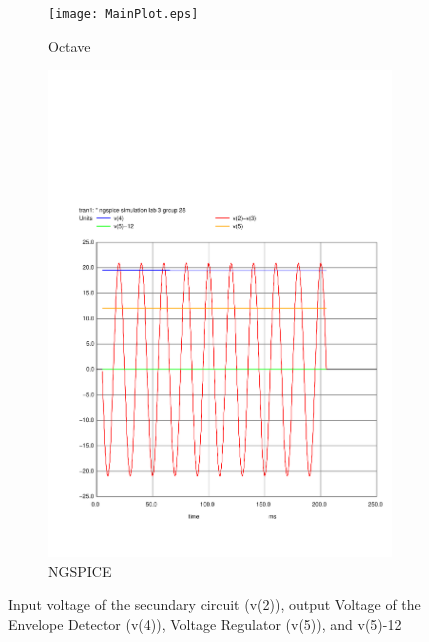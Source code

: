 \begin{figure}[H] 
\centering
\begin{subfigure}{0.4\textwidth}
\texttt{[image: MainPlot.eps]}
\caption{Octave}
\label{fig:first}
\end{subfigure}
\begin{subfigure}{0.3\textwidth}
\includegraphics[width=\textwidth]{sim3.pdf}
\caption{NGSPICE}
\label{fig:second}
\end{subfigure}
\caption{Input voltage of the secundary circuit (v(2)), output Voltage of the Envelope Detector (v(4)), Voltage
Regulator (v(5)), and v(5)-12}
\end{figure}

